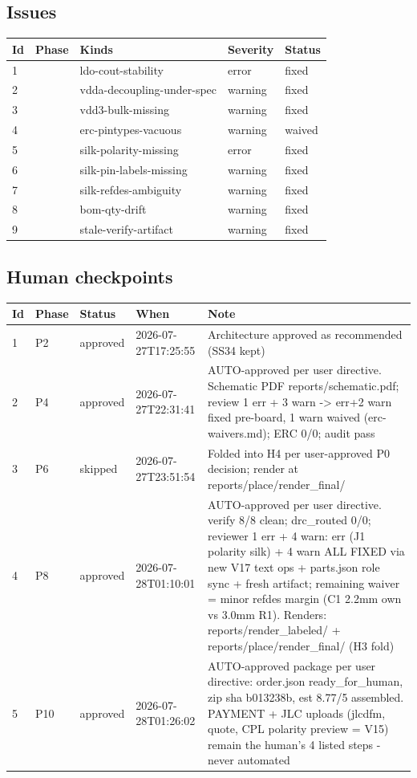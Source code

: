 \documentclass[11pt,a4paper]{article}
\begin{document}
\subsection*{Issues}
{\small
\begin{longtable}{llp{5cm}ll}
\toprule
\textbf{Id} & \textbf{Phase} & \textbf{Kinds} & \textbf{Severity} & \textbf{Status} \\
\midrule
\endhead
1 &  & ldo-cout-stability & error & fixed \\
2 &  & vdda-decoupling-under-spec & warning & fixed \\
3 &  & vdd3-bulk-missing & warning & fixed \\
4 &  & erc-pintypes-vacuous & warning & waived \\
5 &  & silk-polarity-missing & error & fixed \\
6 &  & silk-pin-labels-missing & warning & fixed \\
7 &  & silk-refdes-ambiguity & warning & fixed \\
8 &  & bom-qty-drift & warning & fixed \\
9 &  & stale-verify-artifact & warning & fixed \\
\bottomrule
\end{longtable}
}
\subsection*{Human checkpoints}
{\small
\begin{longtable}{lllp{2.6cm}p{6.4cm}}
\toprule
\textbf{Id} & \textbf{Phase} & \textbf{Status} & \textbf{When} & \textbf{Note} \\
\midrule
\endhead
1 & P2 & approved & 2026-07-27T17:25:55 & Architecture approved as recommended (SS34 kept) \\
2 & P4 & approved & 2026-07-27T22:31:41 & AUTO-approved per user directive. Schematic PDF reports/schematic.pdf; review 1 err + 3 warn -\textgreater{} err+2 warn fixed pre-board, 1 warn waived (erc-waivers.md); ERC 0/0; audit pass \\
3 & P6 & skipped & 2026-07-27T23:51:54 & Folded into H4 per user-approved P0 decision; render at reports/place/render\_final/ \\
4 & P8 & approved & 2026-07-28T01:10:01 & AUTO-approved per user directive. verify 8/8 clean; drc\_routed 0/0; reviewer 1 err + 4 warn: err (J1 polarity silk) + 4 warn ALL FIXED via new V17 text ops + parts.json role sync + fresh artifact; remaining waiver = minor refdes margin (C1 2.2mm own vs 3.0mm R1). Renders: reports/render\_labeled/ + reports/place/render\_final/ (H3 fold) \\
5 & P10 & approved & 2026-07-28T01:26:02 & AUTO-approved package per user directive: order.json ready\_for\_human, zip sha b013238b, est 8.77/5 assembled. PAYMENT + JLC uploads (jlcdfm, quote, CPL polarity preview = V15) remain the human's 4 listed steps - never automated \\
\bottomrule
\end{longtable}
}
\end{document}
